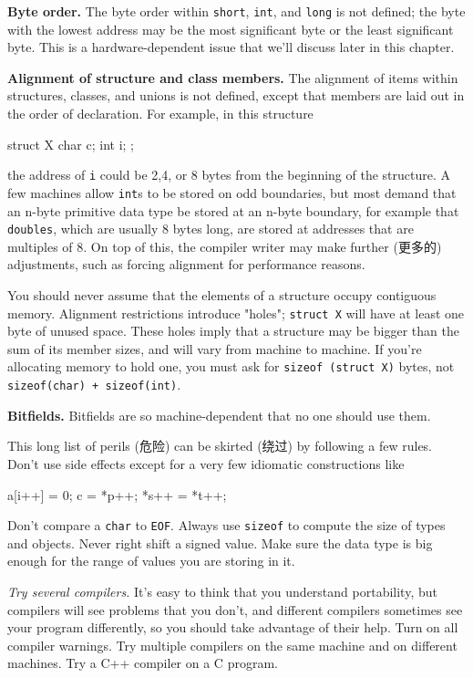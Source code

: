 \textbf{Byte order.} The byte order within \verb'short', \verb'int', and
\verb'long' is not defined; the byte with the lowest address may be the
most significant byte or the least significant byte. This is a
hardware-dependent issue that we'll discuss later in this chapter.

\textbf{Alignment of structure and class members.} The alignment of items
within structures, classes, and unions is not defined, except that members
are laid out in the order of declaration. For example, in this structure
\begin{wellcode}
    struct X {
        char    c;
        int     i;
    };
\end{wellcode}
the address of \verb'i' could be 2,4, or 8 bytes from the beginning of the
structure. A few machines allow \verb'int's to be stored on odd boundaries,
but most demand that an n-byte primitive data type be stored at an n-byte
boundary, for example that \verb'doubles', which are usually 8 bytes long,
are stored at addresses that are multiples of 8.  On top of this, the
compiler writer may make further (更多的) adjustments, such as forcing
alignment for performance reasons.

You should never assume that the elements of a structure occupy contiguous
memory. Alignment restrictions introduce "holes"; \verb'struct X' will have
at least one byte of unused space. These holes imply that a structure may
be bigger than the sum of its member sizes, and will vary from machine to
machine. If you're allocating memory to hold one, you must ask for
\texttt{sizeof (struct X)} bytes, not \verb'sizeof(char) + sizeof(int)'.

\textbf{Bitfields.} Bitfields are so machine-dependent that no one should
use them.

This long list of perils (危险) can be skirted (绕过) by following a few
rules. Don't use side effects except for a very few idiomatic constructions
like
\begin{wellcode}
    a[i++] = 0;
    c = *p++;
    *s++ = *t++;
\end{wellcode}
Don't compare a \verb'char' to \verb'EOF'. Always use \verb'sizeof' to
compute the size of types and objects. Never right shift a signed value.
Make sure the data type is big enough for the range of values you are
storing in it.

\emph{Try several compilers.} It's easy to think that you understand
portability, but compilers will see problems that you don't, and different
compilers sometimes see your program differently, so you should take
advantage of their help. Turn on all compiler warnings. Try multiple
compilers on the same machine and on different machines.  Try a C++
compiler on a C program.

